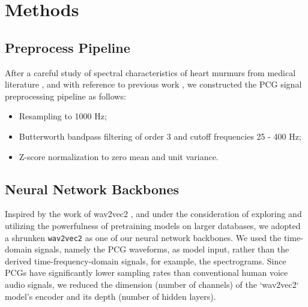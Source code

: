\section{Methods}
\label{sec:methods}




\subsection{Preprocess Pipeline}
\label{subsec:preproc}

After a careful study of spectral characteristics of heart murmurs from medical literature \cite{Noponen_2007}, and with reference to previous work \cite{Schmidt_2010}, we constructed the PCG signal preprocessing pipeline as follows:
\begin{itemize}
    \item Resampling to 1000 Hz;
    \item Butterworth bandpass filtering of order 3 and cutoff frequencies 25 - 400 Hz;
    \item Z-score normalization to zero mean and unit variance.
\end{itemize}

\subsection{Neural Network Backbones}
\label{subsec:backbone}

Inspired by the work of wav2vec2 \cite{baevski2020wav2vec}, and under the consideration of exploring and utilizing the powerfulness of pretraining models on larger databases, we adopted a shrunken \texttt{wav2vec2} as one of our neural network backbones. We used the time-domain signals, namely the PCG waveforms, as model input, rather than the derived time-frequency-domain signals, for example, the spectrograms. Since PCGs have significantly lower sampling rates than conventional human voice audio signals, we reduced the dimension (number of channels) of the `wav2vec2` model's encoder and its depth (number of hidden layers).

